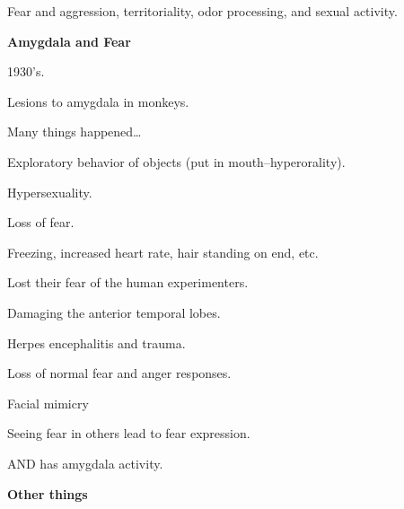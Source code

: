 \begin{coloredlist}
\begin{coloredlist}
\begin{coloredlist}
            \item Fear and aggression, territoriality, odor processing, and sexual activity.
            \item \textbf{Amygdala and Fear}
            \begin{coloredlist}
                \item 1930's.
                \item Lesions to amygdala in monkeys.
                \item Many things happened\ldots
                \begin{coloredlist}
                    \item Exploratory behavior of objects (put in mouth--hyperorality).
                    \item Hypersexuality.
                    \item Loss of fear.
                    \begin{coloredlist}
                        \item Freezing, increased heart rate, hair standing on end, etc.
                        \item Lost their fear of the human experimenters.
                    \end{coloredlist}
                \end{coloredlist}
                \item {}
                \begin{coloredlist}
                    \item Damaging the anterior temporal lobes.
                    \item Herpes encephalitis and trauma.
                \end{coloredlist}
                \begin{coloredlist}
                    \item Loss of normal fear and anger responses.
                \end{coloredlist}
                \item Facial mimicry
                \begin{coloredlist}
                    \item Seeing fear in others lead to fear expression.
                    \item AND has amygdala activity.
                \end{coloredlist}
                \item \textbf{Other things}

\end{coloredlist}
\end{coloredlist}
\end{coloredlist}
\end{coloredlist}
